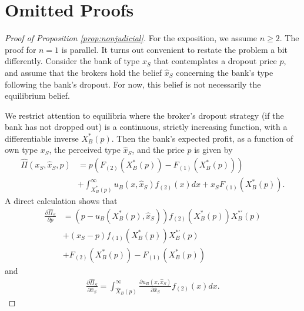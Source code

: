 \documentclass[11pt,twopage]{article}
\begin{document}
\section{Omitted Proofs}
\begin{proof}[Proof of Proposition \ref{prop:nonjudicial}]
For the exposition, we assume $n \geq 2$. The proof for $n=1$ is parallel. It turns out convenient to restate the problem a bit differently. Consider the bank of type $x_S$ that contemplates a dropout price $p$, and assume that the brokers hold the belief $\hat x_S$ concerning the bank's type following the bank's dropout. For now, this belief is not necessarily the equilibrium belief. 

We restrict attention to equilibria where the broker's dropout strategy (if the bank has not dropped out) is a continuous, strictly increasing function, with a differentiable inverse $X_B^*(p)$. Then the bank's expected profit, as a function of own type $x_S$, the perceived type $\hat x_S$, and the price $p$ is given by 
\begin{align}
  \hat \Pi(x_S,\hat x_S,p) &= p (F_{(2)}(X_B^*(p)) - F_{(1)}(X_B^*(p)))\nonumber\\
  &+\int_{ X_B^*(p)}^{\infty} u_B(x,\hat x_S) f_{(2)}(x)dx 
  +x_S F_{(1)}(X_B^*(p)).
   \label{eq:PiS}
\end{align}
A direct calculation shows that
\begin{align} \frac{\partial \hat \Pi_S}{\partial p} &= 
(p-u_B(X_B^*(p),\hat x_S)) f_{(2)}(X_B^*(p))X_B^{*'}(p) \nonumber
\\
&+(x_S - p) f_{(1)}(X_B^*(p))X_B^{*'}(p) \nonumber
\\
&+F_{(2)}(X_B^*(p)) - F_{(1)}(X_B^*(p))
\label{eq:sp}
\end{align}
and 
\begin{align} \frac{\partial \hat \Pi_S}{\partial \hat x_S} = \int_{\hat X_B(p)}^{\infty} \frac{\partial u_B(x,\hat x_S)}{\partial \hat x_S} f_{(2)}(x)dx  .\end{align}



\end{proof}
\end{document}
